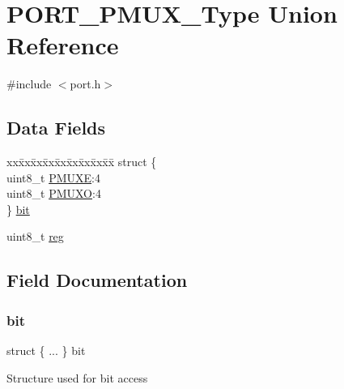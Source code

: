 \hypertarget{union_p_o_r_t___p_m_u_x___type}{}\section{P\+O\+R\+T\+\_\+\+P\+M\+U\+X\+\_\+\+Type Union Reference}
\label{union_p_o_r_t___p_m_u_x___type}


{\ttfamily \#include $<$port.\+h$>$}

\subsection*{Data Fields}
\begin{DoxyCompactItemize}
\item 
\begin{tabbing}
xx\=xx\=xx\=xx\=xx\=xx\=xx\=xx\=xx\=\kill
struct \{\\
\>uint8\_t \mbox{\hyperlink{union_p_o_r_t___p_m_u_x___type_a34acf2fb3b1fdc272bb9b611850e2530}{PMUXE}}:4\\
\>uint8\_t \mbox{\hyperlink{union_p_o_r_t___p_m_u_x___type_a5281f7bf224ea3f385e94c491a55af68}{PMUXO}}:4\\
\} \mbox{\hyperlink{union_p_o_r_t___p_m_u_x___type_a7fa112a0006b26c330e69e1eae3a5f5c}{bit}}\\

\end{tabbing}\item 
uint8\+\_\+t \mbox{\hyperlink{union_p_o_r_t___p_m_u_x___type_a9428adc9af4653a2050e2536b55dec8d}{reg}}
\end{DoxyCompactItemize}


\subsection{Field Documentation}
\mbox{\label{union_p_o_r_t___p_m_u_x___type_a7fa112a0006b26c330e69e1eae3a5f5c}} 
\subsubsection{\texorpdfstring{bit}{bit}}
{\footnotesize\ttfamily struct \{ ... \}   bit}

Structure used for bit access \mbox{\label{union_p_o_r_t___p_m_u_x___type_a34acf2fb3b1fdc272bb9b611850e2530}} 
